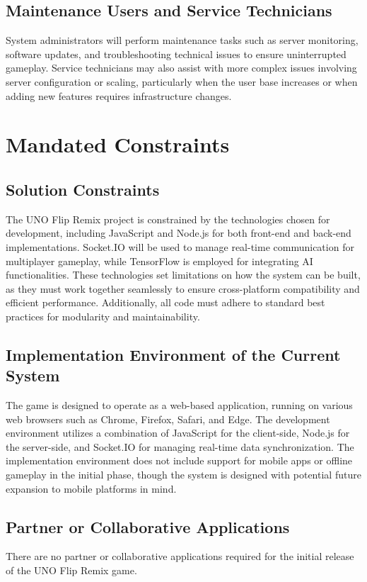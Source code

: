 \documentclass{article}
\begin{document}
\subsection{Maintenance Users and Service Technicians}
System administrators will perform maintenance tasks such as server monitoring, software updates, and troubleshooting technical issues to ensure uninterrupted gameplay. Service technicians may also assist with more complex issues involving server configuration or scaling, particularly when the user base increases or when adding new features requires infrastructure changes.

\section{Mandated Constraints}

\subsection{Solution Constraints}
The UNO Flip Remix project is constrained by the technologies chosen for development, including JavaScript and Node.js for both front-end and back-end implementations. Socket.IO will be used to manage real-time communication for multiplayer gameplay, while TensorFlow is employed for integrating AI functionalities. These technologies set limitations on how the system can be built, as they must work together seamlessly to ensure cross-platform compatibility and efficient performance. Additionally, all code must adhere to standard best practices for modularity and maintainability.

\subsection{Implementation Environment of the Current System}
The game is designed to operate as a web-based application, running on various web browsers such as Chrome, Firefox, Safari, and Edge. The development environment utilizes a combination of JavaScript for the client-side, Node.js for the server-side, and Socket.IO for managing real-time data synchronization. The implementation environment does not include support for mobile apps or offline gameplay in the initial phase, though the system is designed with potential future expansion to mobile platforms in mind.

\subsection{Partner or Collaborative Applications}
There are no partner or collaborative applications required for the initial release of the UNO Flip Remix game.
\end{document}
